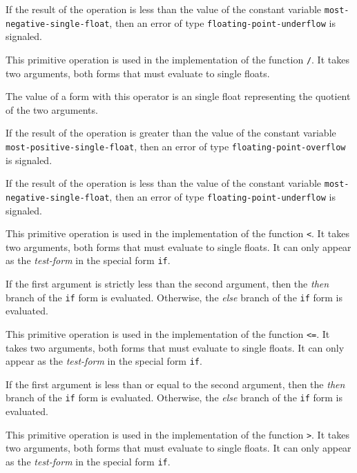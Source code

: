 If the result of the operation is less than the value of the constant
variable \texttt{most-negative-single-float}, then an error of type
\texttt{floating-point-underflow} is signaled.

 {}

This primitive operation is used in the implementation of the
\commonlisp{} function \texttt{/}.  It takes two arguments, both forms
that must evaluate to single floats.

The value of a form with this operator is an single float
representing the quotient of the two arguments.

If the result of the operation is greater than the value of the
constant variable \texttt{most-positive-single-float}, then an error of
type \texttt{floating-point-overflow} is signaled.

If the result of the operation is less than the value of the constant
variable \texttt{most-negative-single-float}, then an error of type
\texttt{floating-point-underflow} is signaled.

 {}

This primitive operation is used in the implementation of the
\commonlisp{} function \texttt{<}.  It takes two arguments, both forms
that must evaluate to single floats.  It can only appear as the
\emph{test-form} in the special form \texttt{if}.

If the first argument is strictly less than the second argument, then
the \emph{then} branch of the \texttt{if} form is evaluated.
Otherwise, the \emph{else} branch of the \texttt{if} form is
evaluated.

 {}

This primitive operation is used in the implementation of the
\commonlisp{} function \texttt{<=}.  It takes two arguments, both forms
that must evaluate to single floats.  It can only appear as the
\emph{test-form} in the special form \texttt{if}.

If the first argument is less than or equal to the second argument,
then the \emph{then} branch of the \texttt{if} form is evaluated.
Otherwise, the \emph{else} branch of the \texttt{if} form is
evaluated.

 {}

This primitive operation is used in the implementation of the
\commonlisp{} function \texttt{>}.  It takes two arguments, both forms
that must evaluate to single floats.  It can only appear as the
\emph{test-form} in the special form \texttt{if}.

